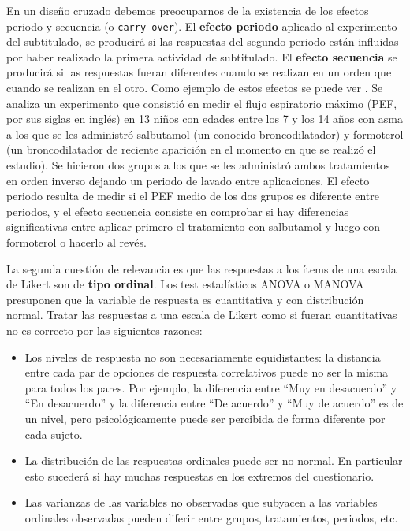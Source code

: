 \documentclass[
  12pt,
  a4paper,
  extrafontsizes,
  onecolumn,
  openright,
  table]{memoir}
\begin{document}
En un diseño cruzado debemos preocuparnos de la existencia de los
efectos periodo y secuencia (o \texttt{carry-over}). El \textbf{efecto
periodo} aplicado al experimento del subtitulado, se producirá si las
respuestas del segundo periodo están influidas por haber realizado la
primera actividad de subtitulado. El \textbf{efecto secuencia} se
producirá si las respuestas fueran diferentes cuando se realizan en un
orden que cuando se realizan en el otro. Como ejemplo de estos efectos
se puede ver \textcite[pp.~35-53]{senn2022}. Se analiza un experimento
que consistió en medir el flujo espiratorio máximo (PEF, por sus siglas
en inglés) en 13 niños con edades entre los 7 y los 14 años con asma a
los que se les administró salbutamol (un conocido broncodilatador) y
formoterol (un broncodilatador de reciente aparición en el momento en
que se realizó el estudio). Se hicieron dos grupos a los que se les
administró ambos tratamientos en orden inverso dejando un periodo de
lavado entre aplicaciones. El efecto periodo resulta de medir si el PEF
medio de los dos grupos es diferente entre periodos, y el efecto
secuencia consiste en comprobar si hay diferencias significativas entre
aplicar primero el tratamiento con salbutamol y luego con formoterol o
hacerlo al revés.

La segunda cuestión de relevancia es que las respuestas a los ítems de
una escala de Likert son de \textbf{tipo ordinal}. Los test estadísticos
ANOVA o MANOVA presuponen que la variable de respuesta es cuantitativa y
con distribución normal. Tratar las respuestas a una escala de Likert
como si fueran cuantitativas no es correcto por las siguientes razones:

\begin{itemize}
\item
  Los niveles de respuesta no son necesariamente equidistantes: la
  distancia entre cada par de opciones de respuesta correlativos puede
  no ser la misma para todos los pares. Por ejemplo, la diferencia entre
  \enquote{Muy en desacuerdo} y \enquote{En desacuerdo} y la diferencia
  entre \enquote{De acuerdo} y \enquote{Muy de acuerdo} es de un nivel,
  pero psicológicamente puede ser percibida de forma diferente por cada
  sujeto.
\item
  La distribución de las respuestas ordinales puede ser no normal. En
  particular esto sucederá si hay muchas respuestas en los extremos del
  cuestionario.
\item
  Las varianzas de las variables no observadas que subyacen a las
  variables ordinales observadas pueden diferir entre grupos,
  tratamientos, periodos, etc.
\end{itemize}
\end{document}
